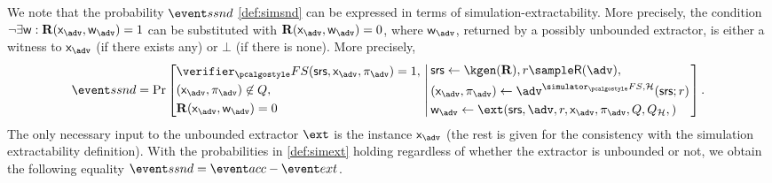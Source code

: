   \label{rem:simext_to_simsnd}
  We note that the probability $\ssndProb$ \cref{def:simsnd} can be expressed in
  terms of simulation-extractability. More precisely, the
  condition $\neg \exists \wit: \REL(\inp_\adv, \wit_\adv) = 1$ can be substituted with
  $\REL(\inp_\adv, \wit_\adv) = 0$, where $\wit_\adv$, returned by a possibly unbounded
  extractor, is either a witness to $\inp_\adv$ (if there exists any) or $\bot$ (if
  there is none). More precisely,
\[
      \ssndProb =
      \Pr\left[
        \begin{aligned}
          & \verifier_\fs(\srs, \inp_{\adv}, \zkproof_{\adv}) = 1,\\
          & (\inp_{\advse}, \zkproof_{\advse}) \not\in Q,\\
          & \REL(\inp_{\adv}, \wit_{\adv}) = 0
        \end{aligned}
        \, \left| \,
      \begin{aligned}
        & \srs \gets \kgen(\REL), r \sample \RND{\advse},\\
        & (\inp_{\advse}, \zkproof_{\advse}) \gets \advse^{\simulator_\fs,
          \ro} (\srs; r)\\
        & \wit_{\adv} \gets \ext(\srs, \advse, r, \inp_{\advse}, \zkproof_{\advse},
			Q, Q_\ro,) 
      \end{aligned}
		\right.  \right].
\]
The only necessary input to the unbounded extractor $\ext$ is the instance
$\inp_\adv$ (the rest is given for the consistency with the simulation extractability
definition). 
%
With the probabilities in \cref{def:simext} holding regardless of whether the extractor
is unbounded or not, we obtain the following equality
$ \ssndProb = \accProb - \extProb$.


\fi


